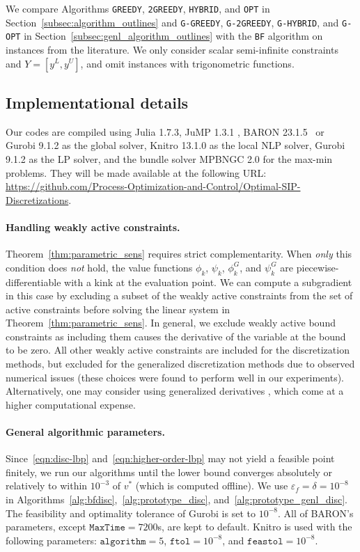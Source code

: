 \documentclass{article}
\newcommand{\1}[1]{\mathds{1}\left[#1\right]}
\begin{document}
We compare Algorithms \texttt{GREEDY}, \texttt{2GREEDY}, \texttt{HYBRID}, and \texttt{OPT} in Section~\ref{subsec:algorithm_outlines} and \texttt{G-GREEDY}, \texttt{G-2GREEDY}, \texttt{G-HYBRID}, and \texttt{G-OPT}
in Section~\ref{subsec:genl_algorithm_outlines} with the \texttt{BF} algorithm on instances from the literature. 
We only consider scalar semi-infinite constraints and $Y = [y^L, y^U]$, and omit instances with trigonometric functions. 


\subsection{Implementational details}
Our codes are compiled using Julia 1.7.3, JuMP 1.3.1 \cite{JuMP2017}, BARON 23.1.5~\cite{baron} or Gurobi 9.1.2 as the global solver, Knitro 13.1.0 as the local NLP solver, Gurobi 9.1.2 as the LP solver, and the bundle solver MPBNGC 2.0 \cite{makela2003multiobjective} for the max-min problems. 
They will be made available at the following URL: \\ \url{https://github.com/Process-Optimization-and-Control/Optimal-SIP-Discretizations}.


\paragraph*{Handling weakly active constraints.}
Theorem~\ref{thm:parametric_sens} requires strict complementarity.
When \textit{only} this condition does \textit{not} hold,
the value functions $\phi_k$, $\psi_k$, $\phi^G_k$, and $\psi^G_k$ are piecewise-differentiable with a kink at the evaluation point. 
We can compute a subgradient in this case by excluding a subset of the weakly active constraints from the set of active constraints before solving the linear system in Theorem~\ref{thm:parametric_sens}.
In general, we exclude weakly active bound constraints as including them causes the derivative of the variable at the bound to be zero. 
All other weakly active constraints are included for the discretization methods, but excluded for the generalized discretization methods due to observed numerical issues (these choices were found to perform well in our experiments). 
Alternatively, one may consider using generalized derivatives \cite{stechlinski2019generalized}, which come at a higher computational expense. 


\paragraph*{General algorithmic parameters.}
Since~\eqref{eqn:disc-lbp} and~\eqref{eqn:higher-order-lbp} may not yield a feasible point finitely, we run our algorithms until the lower bound converges absolutely or relatively to within $10^{-3}$ of $v^*$ (which is computed offline).
We use $\varepsilon_f = \delta = 10^{-8}$ in Algorithms~\ref{alg:bfdisc},~\ref{alg:prototype_disc}, and~\ref{alg:prototype_genl_disc}.
The feasibility and optimality tolerance of Gurobi is set to $10^{-8}$.
All of BARON's parameters, except $\texttt{MaxTime} = 7200$s, are kept to default. 
Knitro is used with the following parameters: $\texttt{algorithm}=5$,  $\texttt{ftol}=10^{-8}$, and $\texttt{feastol}=10^{-8}$.  
\end{document}
